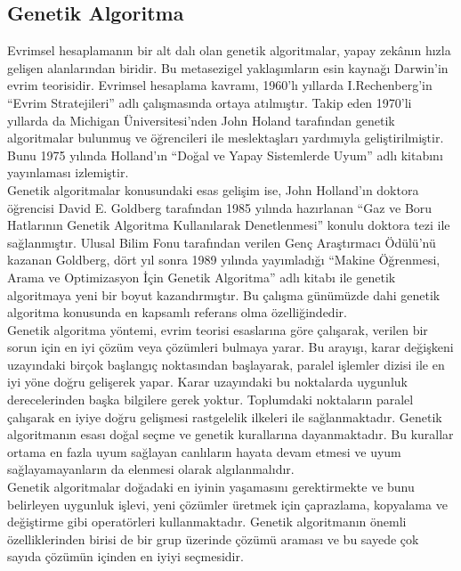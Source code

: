 \documentclass[12pt, a4paper]{article}
\begin{document}
\begin{flushleft}
	\subsection{Genetik Algoritma }
		Evrimsel hesaplamanın bir alt dalı olan genetik algoritmalar, yapay zekânın 
	hızla gelişen alanlarından biridir. Bu metasezigel yaklaşımların 
	esin kaynağı Darwin’in evrim teorisidir. Evrimsel hesaplama kavramı, 1960’lı 
	yıllarda I.Rechenberg’in “Evrim Stratejileri” adlı çalışmasında ortaya atılmıştır. 
	Takip eden 1970’li yıllarda da Michigan Üniversitesi’nden John Holand tarafından 
	genetik algoritmalar bulunmuş ve öğrencileri ile meslektaşları yardımıyla 
	geliştirilmiştir. Bunu 1975 yılında Holland’ın “Doğal ve Yapay Sistemlerde Uyum”
	adlı kitabını yayınlaması izlemiştir.\\[5pt]
	Genetik algoritmalar konusundaki esas gelişim ise, John Holland’ın doktora 
	öğrencisi David E. Goldberg tarafından 1985 yılında hazırlanan “Gaz ve Boru 
	Hatlarının Genetik Algoritma Kullanılarak Denetlenmesi” konulu doktora tezi ile 
	sağlanmıştır. Ulusal Bilim Fonu tarafından verilen Genç Araştırmacı Ödülü’nü 
	kazanan Goldberg, dört yıl sonra 1989 yılında yayımladığı “Makine Öğrenmesi, 
	Arama ve Optimizasyon İçin Genetik Algoritma” adlı kitabı ile genetik algoritmaya 
	yeni bir boyut kazandırmıştır. Bu çalışma günümüzde dahi genetik algoritma 
	konusunda en kapsamlı referans olma özelliğindedir.\\[5pt]
	Genetik algoritma yöntemi, evrim teorisi esaslarına göre çalışarak, verilen bir 
	sorun için en iyi çözüm veya çözümleri bulmaya yarar. Bu arayışı, karar değişkeni 
	uzayındaki birçok başlangıç noktasından başlayarak, paralel işlemler dizisi ile en iyi 
	yöne doğru gelişerek yapar. Karar uzayındaki bu noktalarda uygunluk derecelerinden 
	başka bilgilere gerek yoktur. Toplumdaki noktaların paralel çalışarak en iyiye doğru 
	gelişmesi rastgelelik ilkeleri ile sağlanmaktadır. Genetik algoritmanın esası doğal seçme ve genetik kurallarına dayanmaktadır. Bu kurallar ortama en fazla uyum sağlayan canlıların hayata devam etmesi ve uyum sağlayamayanların da elenmesi olarak algılanmalıdır.\\[5pt]
	Genetik algoritmalar doğadaki en iyinin yaşamasını 
	gerektirmekte ve bunu belirleyen uygunluk işlevi, yeni çözümler üretmek için 
	çaprazlama, kopyalama ve değiştirme gibi operatörleri kullanmaktadır. Genetik 
	algoritmanın önemli özelliklerinden birisi de bir grup üzerinde çözümü araması ve bu 
	sayede çok sayıda çözümün içinden en iyiyi seçmesidir.\\[10pt]
	

\end{flushleft}
\end{document}
